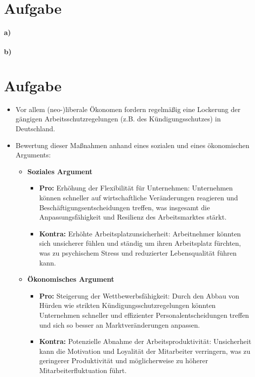 \documentclass[12pt,a4paper]{report}
\begin{document}
	\section{Aufgabe}
	\paragraph{a)}
	\paragraph{b)}
	
	\section{Aufgabe}
	
	\begin{itemize}
   	\item Vor allem (neo-)liberale Ökonomen fordern regelmäßig eine Lockerung der gängigen Arbeitsschutzregelungen (z.B. des Kündigungsschutzes) in Deutschland.
   	\item Bewertung dieser Maßnahmen anhand eines sozialen und eines ökonomischen Arguments:
   	\begin{itemize}
      	\item \textbf{Soziales Argument}
      	\begin{itemize}
         	\item \textbf{Pro:} Erhöhung der Flexibilität für Unternehmen: Unternehmen können schneller auf wirtschaftliche Veränderungen reagieren und Beschäftigungsentscheidungen treffen, was insgesamt die Anpassungsfähigkeit und Resilienz des Arbeitsmarktes stärkt.
          	\item \textbf{Kontra:} Erhöhte Arbeitsplatzunsicherheit: Arbeitnehmer könnten sich unsicherer fühlen und ständig um ihren Arbeitsplatz fürchten, was zu psychischem Stress und reduzierter Lebensqualität führen kann.
        \end{itemize}
        \item \textbf{Ökonomisches Argument}
        \begin{itemize}
        		\item \textbf{Pro:} Steigerung der Wettbewerbsfähigkeit: Durch den Abbau von Hürden wie strikten Kündigungsschutzregelungen könnten Unternehmen schneller und effizienter Personalentscheidungen treffen und sich so besser an Marktveränderungen anpassen.
            \item \textbf{Kontra:} Potenzielle Abnahme der Arbeitsproduktivität: Unsicherheit kann die Motivation und Loyalität der Mitarbeiter verringern, was zu geringerer Produktivität und möglicherweise zu höherer Mitarbeiterfluktuation führt.

\end{itemize}
\end{itemize}
\end{itemize}
\end{document}
